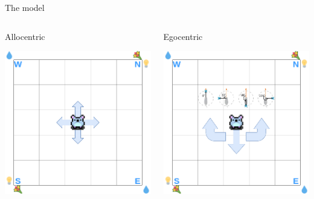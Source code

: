 \documentclass[bigger]{beamer}
\begin{document}
\begin{frame}[label={sec:org85797eb}]{The model}
\addtocounter{framenumber}{-1}
\begin{columns}
\begin{column}{0.5\columnwidth}
\center
Allocentric
\begin{center}
\includegraphics[width=\textwidth]{img/RL_environment-Allo.drawio.png}
\end{center}
\end{column}
\begin{column}{0.5\columnwidth}
\center
Egocentric
\begin{center}
\includegraphics[width=\textwidth]{img/RL_environment-Ego.drawio.png}
\end{center}
\end{column}
\end{columns}
\end{frame}
\end{document}

